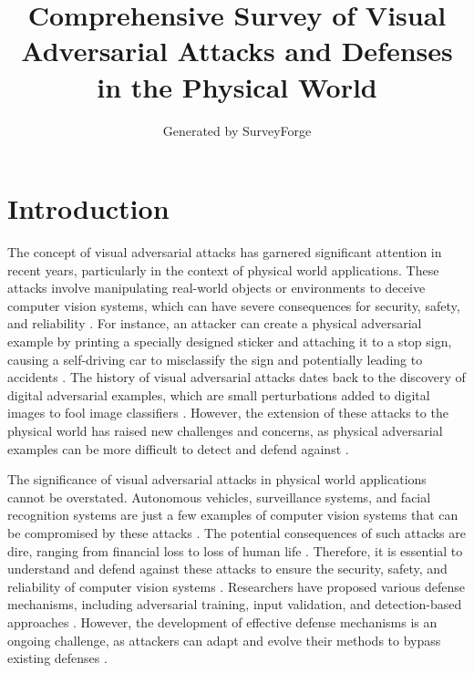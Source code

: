 \documentclass[11pt,a4paper]{article}
\title{Comprehensive Survey of Visual Adversarial Attacks and Defenses in the Physical World}
\author{Generated by SurveyForge}
\date{}
\begin{document}
\maketitle
\tableofcontents
\newpage



\section{Introduction}


The concept of visual adversarial attacks has garnered significant attention in recent years, particularly in the context of physical world applications. These attacks involve manipulating real-world objects or environments to deceive computer vision systems, which can have severe consequences for security, safety, and reliability \cite{doi:10.1201/9781351251389-8}. For instance, an attacker can create a physical adversarial example by printing a specially designed sticker and attaching it to a stop sign, causing a self-driving car to misclassify the sign and potentially leading to accidents \cite{arxiv:1707.08945}. The history of visual adversarial attacks dates back to the discovery of digital adversarial examples, which are small perturbations added to digital images to fool image classifiers \cite{doi:10.24963/ijcai.2021/694}. However, the extension of these attacks to the physical world has raised new challenges and concerns, as physical adversarial examples can be more difficult to detect and defend against \cite{doi:10.1109/cvpr42600.2020.01426}.

The significance of visual adversarial attacks in physical world applications cannot be overstated. Autonomous vehicles, surveillance systems, and facial recognition systems are just a few examples of computer vision systems that can be compromised by these attacks \cite{doi:10.1016/j.sysarc.2020.101766}. The potential consequences of such attacks are dire, ranging from financial loss to loss of human life \cite{doi:10.1109/jiot.2021.3099164}. Therefore, it is essential to understand and defend against these attacks to ensure the security, safety, and reliability of computer vision systems \cite{doi:10.1016/j.eng.2019.12.012}. Researchers have proposed various defense mechanisms, including adversarial training, input validation, and detection-based approaches \cite{arxiv:2102.01356}. However, the development of effective defense mechanisms is an ongoing challenge, as attackers can adapt and evolve their methods to bypass existing defenses \cite{doi:10.1109/iros51168.2021.9636638}.
\end{document}
